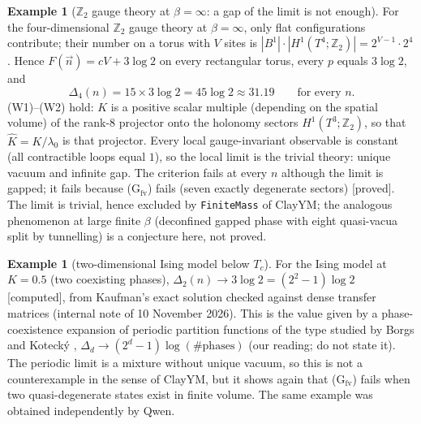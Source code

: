 \documentclass[11pt,a4paper]{article}
\theoremstyle{plain}
\theoremstyle{definition}
\newtheorem{example}[theorem]{Example}
\theoremstyle{remark}
\numberwithin{equation}{section}
\newcommand{\Z}{\mathbb{Z}}
\newcommand{\Kh}{\widehat K}
\newcommand{\st}[1]{\textsf{[#1]}}
\begin{document}
\begin{example}[$\Z_2$ gauge theory at $\beta=\infty$: a gap of the limit is not enough]\label{ex:z2}
For the four-dimensional $\Z_2$ gauge theory at $\beta=\infty$, only flat configurations contribute; their number on a torus with $V$
sites is $|B^1|\cdot|H^1(T^4;\Z_2)|=2^{V-1}\cdot2^4$. Hence $F(\vec n)=cV+3\log2$ on every rectangular torus, every $p$ equals $3\log2$,
and
\[
\Delta_4(n)=15\times3\log2=45\log2\approx31.19\qquad\text{for every }n.
\]
(W1)--(W2) hold: $K$ is a positive scalar multiple (depending on the spatial volume) of the rank-$8$ projector onto the holonomy sectors $H^1(T^3;\Z_2)$, so that $\Kh=K/\lambda_0$ is that projector. Every local gauge-invariant observable is
constant (all contractible loops equal $1$), so the local limit is the trivial theory: unique vacuum and infinite gap. The criterion
fails at every $n$ although the limit is gapped; it fails because (G$_{\mathrm{fv}}$) fails (seven exactly degenerate sectors) \st{proved}. The
limit is trivial, hence excluded by \texttt{FiniteMass} of ClayYM; the analogous phenomenon at large finite $\beta$ (deconfined gapped
phase with eight quasi-vacua split by tunnelling) is a conjecture here, not proved.
\end{example}

\begin{example}[two-dimensional Ising model below $T_c$]\label{ex:ising}
For the Ising model at $K=0.5$ (two coexisting phases), $\Delta_2(n)\to3\log2=(2^2-1)\log2$ \st{computed}, from Kaufman's exact solution
\cite{Kau49} checked against dense transfer matrices (internal note of 10 November 2026). This is the value given by a phase-coexistence
expansion of periodic partition functions of the type studied by Borgs and Koteck\'y \cite{BK90}, $\Delta_d\to(2^d-1)\log(\#\text{phases})$
(our reading; \cite{BK90} do not state it). The periodic limit is a mixture without unique vacuum, so this is not a counterexample in the
sense of ClayYM, but it shows again that (G$_{\mathrm{fv}}$) fails when two quasi-degenerate states exist in finite volume. The same
example was obtained independently by Qwen.
\end{example}
\end{document}
